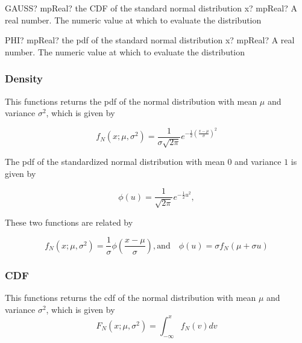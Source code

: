 \vspace{0.6cm}
\begin{mpFunctionsExtract}
	\mpWorksheetFunctionOneNotImplemented
	{GAUSS? mpReal? the CDF of the  standard normal distribution}
	{x? mpReal? A real number. The numeric value at which to evaluate the distribution}
\end{mpFunctionsExtract}


\vspace{0.6cm}
\begin{mpFunctionsExtract}
	\mpWorksheetFunctionOneNotImplemented
	{PHI? mpReal? the pdf of the  standard normal distribution}
	{x? mpReal? A real number. The numeric value at which to evaluate the distribution}
\end{mpFunctionsExtract}




\subsubsection{Density}
\label{sec:NormalDistribution_pdf}
%

\vspace{0.3cm}
This functions returns the pdf of the normal distribution with mean $\mu$ and variance $\sigma^2$, which is given by

\begin{equation} \label{eq:Normal_pdf}
	f_N(x; \mu, \sigma^2) = \frac{1}{\sigma \sqrt{2\pi}} e^{- \frac{1}{2} \left(\frac{x-\mu}{\sigma}\right)^2}
\end{equation}

The pdf of the standardized normal distribution with mean $0$ and variance $1$ is given by

\begin{equation} \label{eq:StandardNormal_pdf}
	\phi(u) = \frac{1}{\sqrt{2\pi}} e^{- \frac{1}{2} u^2}, 
\end{equation}

These two functions are related by

\begin{equation} 
	f_N(x; \mu, \sigma^2) =  \frac{1}{\sigma} \phi \left(\frac{x-\mu}{\sigma} \right), \text{and} \quad  \phi(u) = \sigma f_N(\mu + \sigma u)
\end{equation}


\subsubsection{CDF}
\label{sec:NormalDistribution_CDF}
%
This functions returns the cdf of the normal distribution with mean $\mu$ and variance $\sigma^2$, which is given by
\begin{equation}
	F_N(x; \mu, \sigma^2) = \int_{-\infty}^x f_N(v) dv
\end{equation}

